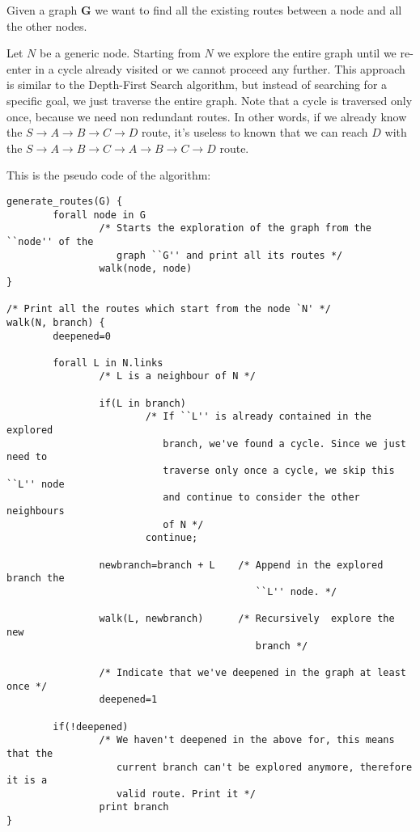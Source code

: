\documentclass[a4paper]{article}
\begin{document}
Given a graph $\mathbf{G}$ we want to find all the existing routes between a node and
all the other nodes.

Let $N$ be a generic node. Starting from $N$ we explore the entire graph
until we re-enter in a cycle already visited or we cannot proceed any further.
This approach is similar to the Depth-First Search\cite{DFS} algorithm, but instead of
searching for a specific goal, we just traverse the entire graph.
Note that a cycle is traversed only once, because we need non redundant
routes. In other words, if we already know the $S \rightarrow A \rightarrow B
\rightarrow C \rightarrow D$ route,
it's useless to known that we can reach $D$ with the $S \rightarrow A
\rightarrow B \rightarrow C \rightarrow A \rightarrow B \rightarrow C
\rightarrow D$ route.

This is the pseudo code of the algorithm:

\begin{verbatim}
generate_routes(G) {
        forall node in G
                /* Starts the exploration of the graph from the ``node'' of the
                   graph ``G'' and print all its routes */
                walk(node, node)
}

/* Print all the routes which start from the node `N' */
walk(N, branch) {
        deepened=0

        forall L in N.links
                /* L is a neighbour of N */

                if(L in branch)
                        /* If ``L'' is already contained in the explored
                           branch, we've found a cycle. Since we just need to
                           traverse only once a cycle, we skip this ``L'' node
                           and continue to consider the other neighbours
                           of N */
                        continue;

                newbranch=branch + L    /* Append in the explored branch the
                                           ``L'' node. */

                walk(L, newbranch)      /* Recursively  explore the new
                                           branch */
                
                /* Indicate that we've deepened in the graph at least once */
                deepened=1

        if(!deepened)
                /* We haven't deepened in the above for, this means that the
                   current branch can't be explored anymore, therefore it is a
                   valid route. Print it */
                print branch
}
\end{verbatim}
\end{document}
